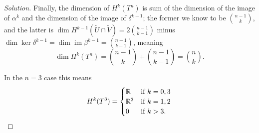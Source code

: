 \documentclass[10pt]{article}
\providecommand{\RR}{\mathbb R}
\newenvironment{soln}{\begin{proof}[Solution]}{\end{proof}}
\begin{document}
\begin{soln}
    Finally, the dimension of $H^k(T^n)$ is
    sum of the dimension of the image of $\alpha^k$
    and the dimension of the image of $\delta^{k-1}$;
    the former we know to be $\binom{n-1}k$,
    and the latter is $\dim H^{k-1}(\tilde U\cap\tilde V) =2\binom{n-1}{k-1}$
    minus $\dim\ker\delta^{k-1} = \dim\operatorname{im}\beta^{k-1}
    = \binom{n-1}{k-1}$, meaning
    \begin{equation*}
	\dim H^k(T^n) = \binom{n-1}k + \binom{n-1}{k-1} = \boxed{\binom nk}.
    \end{equation*}

    In the $n=3$ case this means
    \begin{equation*}
        H^k(T^3) = \begin{cases}
	    \RR & \text{if }k=0,3\\
	    \RR^3 & \text{if }k=1,2\\
	    0 & \text{if }k > 3.
        \end{cases}\qedhere
    \end{equation*}
\end{soln}
\end{document}
